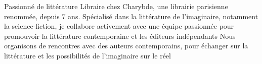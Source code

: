 

\begin{cvskills}


  \cvskill
    {Passionné de littérature} %
    {Libraire chez Charybde, une librairie parisienne renommée, depuis 7 ans. \newline Spécialisé dans la littérature de l'imaginaire, notamment la science-fiction, \newline je  collabore  activement avec une équipe passionnée   \newline pour promouvoir la littérature contemporaine et les éditeurs indépendants \newline Nous organisons de rencontres avec des auteurs contemporains, pour échanger sur la littérature et les possibilités de l'imaginaire sur le réel} %

\end{cvskills}

